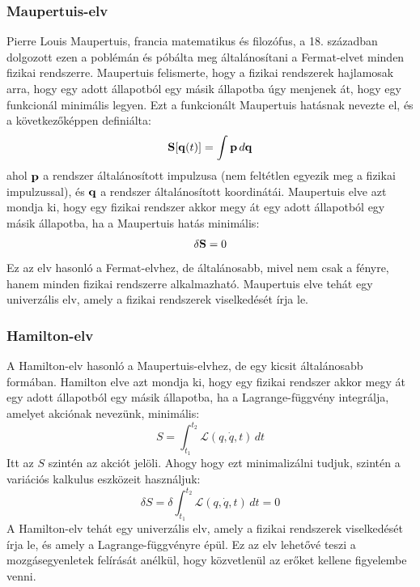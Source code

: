 \documentclass[a4paper,12pt]{article}
\begin{document}
\subsubsection*{Maupertuis-elv}
Pierre Louis Maupertuis, francia matematikus és filozófus, a 18. században dolgozott ezen a poblémán és póbálta meg általánosítani a Fermat-elvet minden fizikai rendszerre. Maupertuis felismerte, hogy a fizikai rendszerek hajlamosak arra,
hogy egy adott állapotból egy másik állapotba úgy menjenek át, hogy egy funkcionál minimális legyen. Ezt a funkcionált Maupertuis hatásnak nevezte el, és a következőképpen definiálta:
\begin{equation}
    \bold{S}[\bold{q}(t)] = \int \bold{p} \, d\bold{q}
\end{equation}
ahol $\bold{p}$ a rendszer általánosított impulzusa (nem feltétlen egyezik meg a fizikai impulzussal), és $\bold{q}$ a rendszer általánosított koordinátái. Maupertuis elve azt mondja ki, hogy egy fizikai rendszer akkor megy át egy adott állapotból egy másik állapotba,
ha a Maupertuis hatás minimális:
\begin{equation}
    \delta \bold{S} = 0
\end{equation}
Ez az elv hasonló a Fermat-elvhez, de általánosabb, mivel nem csak a fényre, hanem minden fizikai rendszerre alkalmazható. Maupertuis elve tehát egy univerzális elv, amely a fizikai rendszerek viselkedését írja le.

\subsubsection*{Hamilton-elv}
A Hamilton-elv hasonló a Maupertuis-elvhez, de egy kicsit általánosabb formában. Hamilton elve azt mondja ki, hogy egy fizikai rendszer akkor megy át egy adott állapotból egy másik állapotba,
ha a Lagrange-függvény integrálja, amelyet akciónak nevezünk, minimális:
\begin{equation}
    S = \int_{t_1}^{t_2} \mathcal{L}(q, \dot{q}, t) \, dt
\end{equation}
Itt az $S$ szintén az akciót jelöli. Ahogy hogy ezt minimalizálni tudjuk, szintén a variációs kalkulus eszközeit használjuk:
\begin{equation}
    \delta S = \delta \int_{t_1}^{t_2} \mathcal{L}(q, \dot{q}, t) \, dt = 0
\end{equation}
A Hamilton-elv tehát egy univerzális elv, amely a fizikai rendszerek viselkedését írja le, és amely a Lagrange-függvényre épül. Ez az elv lehetővé teszi a mozgásegyenletek felírását anélkül, hogy közvetlenül az erőket kellene figyelembe venni.
\end{document}
